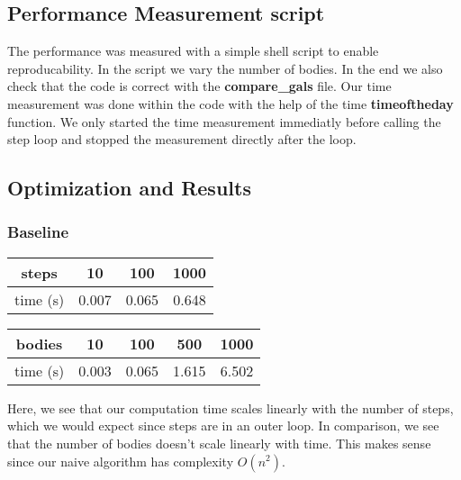 \documentclass[a4paper]{scrartcl}
\begin{document}
    \subsection{Performance Measurement script}
        The performance was measured with a simple shell script to enable
        reproducability. In the script we vary the number of bodies. In the end
        we also check that the code is correct with the \textbf{compare\_gals} file. Our
        time measurement was done within the code with the help of the time
        \textbf{timeoftheday} function. We only started the time measurement
        immediatly before calling the step loop and stopped the measurement
        directly after the loop.

    \subsection{Optimization and Results}
        \subsubsection{Baseline}
            \noindent\begin{tabular}{c|c|c|c}
                steps & 10 & 100 & 1000 \\
                \hline
                time (s) & 0.007 & 0.065 & 0.648\\
            \end{tabular}

            \noindent\begin{tabular}{c|c|c|c|c}
                bodies & 10 & 100 & 500 & 1000 \\
                \hline
                time (s) & 0.003 & 0.065 & 1.615 & 6.502\\
            \end{tabular}
            
            Here, we see that our computation time scales linearly with the
            number of steps, which we would expect since steps are in an outer
            loop. In comparison, we see that the number of bodies doesn't scale
            linearly with time. This makes sense since our naive algorithm has complexity $O(n^2)$.
\end{document}
